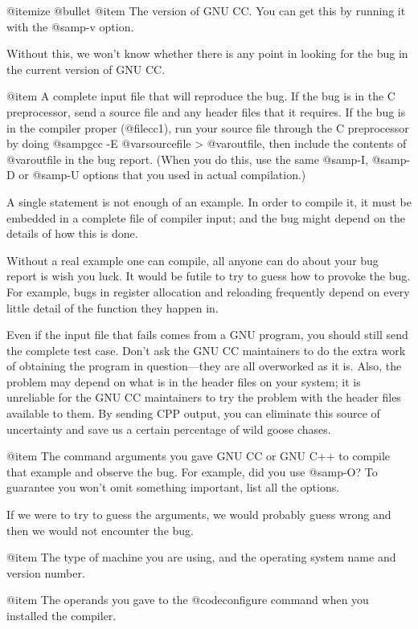 @itemize @bullet
@item
The version of GNU CC.  You can get this by running it with the
@samp{-v} option.

Without this, we won't know whether there is any point in looking for
the bug in the current version of GNU CC.

@item
A complete input file that will reproduce the bug.  If the bug is in the
C preprocessor, send a source file and any header files that it
requires.  If the bug is in the compiler proper (@file{cc1}), run your
source file through the C preprocessor by doing @samp{gcc -E
@var{sourcefile} > @var{outfile}}, then include the contents of
@var{outfile} in the bug report.  (When you do this, use the same
@samp{-I}, @samp{-D} or @samp{-U} options that you used in actual
compilation.)

A single statement is not enough of an example.  In order to compile it,
it must be embedded in a complete file of compiler input; and the bug
might depend on the details of how this is done.

Without a real example one can compile, all anyone can do about your bug
report is wish you luck.  It would be futile to try to guess how to
provoke the bug.  For example, bugs in register allocation and reloading
frequently depend on every little detail of the function they happen in.

Even if the input file that fails comes from a GNU program, you should
still send the complete test case.  Don't ask the GNU CC maintainers to
do the extra work of obtaining the program in question---they are all
overworked as it is.  Also, the problem may depend on what is in the
header files on your system; it is unreliable for the GNU CC maintainers
to try the problem with the header files available to them.  By sending
CPP output, you can eliminate this source of uncertainty and save us
a certain percentage of wild goose chases.

@item
The command arguments you gave GNU CC or GNU C++ to compile that example
and observe the bug.  For example, did you use @samp{-O}?  To guarantee
you won't omit something important, list all the options.

If we were to try to guess the arguments, we would probably guess wrong
and then we would not encounter the bug.

@item
The type of machine you are using, and the operating system name and
version number.

@item
The operands you gave to the @code{configure} command when you installed
the compiler.

